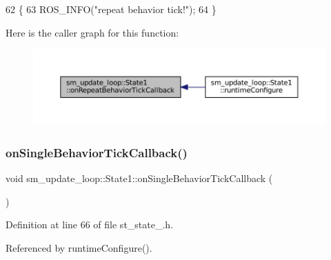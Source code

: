 \begin{DoxyCode}
62     \{
63         ROS\_INFO(\textcolor{stringliteral}{"repeat behavior tick!"});
64     \}
\end{DoxyCode}
Here is the caller graph for this function\+:
\nopagebreak
\begin{figure}[H]
\begin{center}
\leavevmode
\includegraphics[width=350pt]{structsm__update__loop_1_1State1_aba8ce8c18482665237b1a5cb28deb657_icgraph}
\end{center}
\end{figure}
\mbox{\label{structsm__update__loop_1_1State1_ad15fb64f4f918c423038180d434d7220}} 
\subsubsection{\texorpdfstring{on\+Single\+Behavior\+Tick\+Callback()}{onSingleBehaviorTickCallback()}}
{\footnotesize\ttfamily void sm\+\_\+update\+\_\+loop\+::\+State1\+::on\+Single\+Behavior\+Tick\+Callback (\begin{DoxyParamCaption}{ }\end{DoxyParamCaption})\hspace{0.3cm}{\ttfamily [inline]}}



Definition at line 66 of file st\+\_\+state\+\_.\+h.



Referenced by runtime\+Configure().


